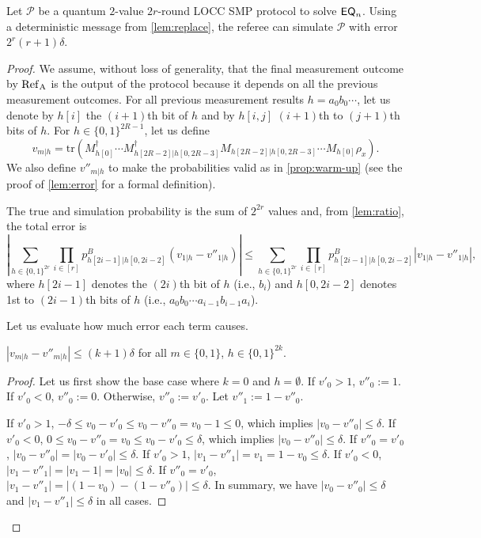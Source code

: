 \begin{lemma}\label{lem:error}
    Let $\mathcal{P}$ be a quantum $2$-value $2r$-round LOCC SMP protocol to solve $\mathsf{EQ}_n$. Using a deterministic message from \cref{lem:replace}, the referee can simulate $\mathcal{P}$ with error $2^r(r+1)\delta$.
\end{lemma}

\begin{proof}
We assume, without loss of generality, that the final measurement outcome by $\rm{Ref}_A$ is the output of the protocol because it depends on all the previous measurement outcomes.
For all previous measurement results $h = a_0 b_0 \cdots$, let us denote by $h[i]$ the $(i+1)$th bit of $h$ and by $h[i,j]$ $(i+1)$th to $(j+1)$th bits of $h$. 
For $h \in \{0,1\}^{2R-1}$, let us define 
\[
v_{m|h} = \mathrm{tr}(M_{h[0]}^\dagger \cdots M_{h[2R-2]|h[0,2R-3]}^\dagger M_{h[2R-2]|h[0,2R-3]} \cdots M_{h[0]} \rho_x).
\] 
We also define $v''_{m|h}$ to make the probabilities valid as in \cref{prop:warm-up} (see the proof of \cref{lem:error} for a formal definition).

The true and simulation probability is the sum of $2^{2r}$ values and, from \cref{lem:ratio}, the total error is
\[
    \left| \sum_{h \in \{0,1\}^{2r}} \prod_{i \in [r]} p^B_{h[2i-1]|h[0,2i-2]} (v_{1|h} - v''_{1|h}) \right| \leq \sum_{h \in \{0,1\}^{2r}} \prod_{i \in [r]} p^B_{h[2i-1]|h[0,2i-2]}  |v_{1|h} - v''_{1|h}|,
\]
where $h[2i-1]$ denotes the $(2i)$th bit of $h$ (i.e., $b_i$) and $h[0,2i-2]$ denotes 1st to $(2i-1)$th bits of $h$ (i.e., $a_0b_0\cdots a_{i-1} b_{i-1} a_i$).

Let us evaluate how much error each term causes.
\begin{lemma}
    $|v_{m|h} - v''_{m|h}| \leq (k+1) \delta$ for all $m \in \{0,1\}$, $h \in \{0,1\}^{2k}$.
\end{lemma}

\begin{proof}
    Let us first show the base case where $k=0$ and $h = \emptyset$. If $v'_0 > 1$, $v''_0 := 1$. If $v'_0 < 0$, $v''_0 := 0$. Otherwise, $v''_0 := v'_0$. Let $v''_1 := 1-v''_0$. 
    
    If $v'_0 > 1$, $- \delta \leq v_0 - v'_0 \leq v_0 - v''_0 = v_0 - 1 \leq 0$, which implies $|v_0 - v''_0| \leq \delta$. If $v'_0 < 0$, $0 \leq v_0 - v''_0 = v_0 \leq v_0 - v'_0 \leq \delta$, which implies $|v_0 - v''_0| \leq \delta$. If $v''_0 = v'_0$, $|v_0 - v''_0| = |v_0 - v'_0| \leq \delta$.
    If $v'_0 > 1$, $|v_1 - v''_1| = v_1 = 1-v_0 \leq \delta$. If $v'_0 < 0$, $|v_1 - v''_1| = |v_1 - 1| = |v_0| \leq \delta$. If $v''_0 = v'_0$, $|v_1 - v''_1| = |(1-v_0) - (1-v''_0)| \leq \delta$. In summary, we have $|v_0 - v''_0| \leq \delta$ and $|v_1 - v''_1| \leq \delta$ in all cases.
    

\end{proof}
\end{proof}
